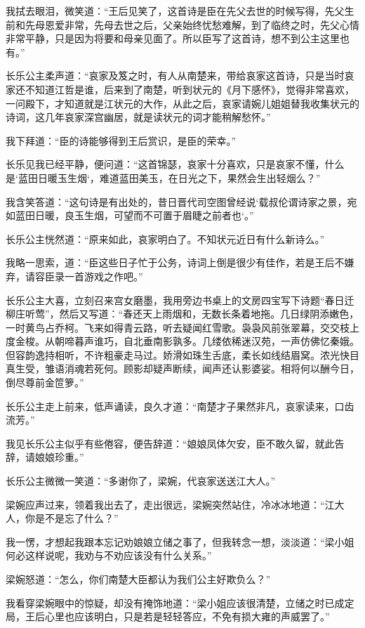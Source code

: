我拭去眼泪，微笑道：“王后见笑了，这首诗是臣在先父去世的时候写得，先父生前和先母恩爱非常，先母去世之后，父亲始终忧愁难解，到了临终之时，先父心情非常平静，只是因为将要和母亲见面了。所以臣写了这首诗，想不到公主这里也有。”

长乐公主柔声道：“哀家及笈之时，有人从南楚来，带给哀家这首诗，只是当时哀家还不知道江哲是谁，后来到了南楚，听到状元的《月下感怀》，觉得非常喜欢，一问殿下，才知道就是江状元的大作，从此之后，哀家请婉儿姐姐替我收集状元的诗词，这几年哀家深宫幽居，就是读状元的词才能稍解愁怀。”

我下拜道：“臣的诗能够得到王后赏识，是臣的荣幸。”

长乐见我已经平静，便问道：“这首锦瑟，哀家十分喜欢，只是哀家不懂，什么是‘蓝田日暖玉生烟‘，难道蓝田美玉，在日光之下，果然会生出轻烟么？”

我含笑答道：“这句诗是有出处的，昔日晋代司空图曾经说‘载叔伦谓诗家之景，宛如蓝田日暖，良玉生烟，可望而不可置于眉睫之前者也‘。”

长乐公主恍然道：“原来如此，哀家明白了。不知状元近日有什么新诗么。”

我略一思索，道：“臣这些日子忙于公务，诗词上倒是很少有佳作，若是王后不嫌弃，请容臣录一首游戏之作吧。”

长乐公主大喜，立刻召来宫女磨墨，我用旁边书桌上的文房四宝写下诗题“春日迁柳庄听莺”，然后又写道：“春还天上雨烟和，无数长条着地拖。几日绿阴添嫩色，一时黄鸟占乔柯。飞来如得青云路，听去疑闻红雪歌。袅袅风前张翠幕，交交枝上度金梭。从朝啼暮声谁巧，自北垂南影孰多。几缕依稀迷汉苑，一声仿佛忆秦娥。但容韵逸持相听，不许粗豪走马过。娇滑如珠生舌底，柔长如线结眉窝。浓光快目真生受，雏语消魂若死何。顾影却疑声断续，闻声还认影婆娑。相将何以酬今日，倒尽尊前金笸箩。”

长乐公主走上前来，低声诵读，良久才道：“南楚才子果然非凡，哀家读来，口齿流芳。”

我见长乐公主似乎有些倦容，便告辞道：“娘娘凤体欠安，臣不敢久留，就此告辞，请娘娘珍重。”

长乐公主微微一笑道：“多谢你了，梁婉，代哀家送送江大人。”

梁婉应声过来，领着我出去了，走出很远，梁婉突然站住，冷冰冰地道：“江大人，你是不是忘了什么？”

我一愣，才想起我跟本忘记劝娘娘立储之事了，但我转念一想，淡淡道：“梁小姐何必这样说呢，我劝与不劝应该没有什么关系。”

梁婉怒道：“怎么，你们南楚大臣都认为我们公主好欺负么？”

我看穿梁婉眼中的惊疑，却没有掩饰地道：“梁小姐应该很清楚，立储之时已成定局，王后心里也应该明白，只是若是轻轻答应，不免有损大雍的声威罢了。”

